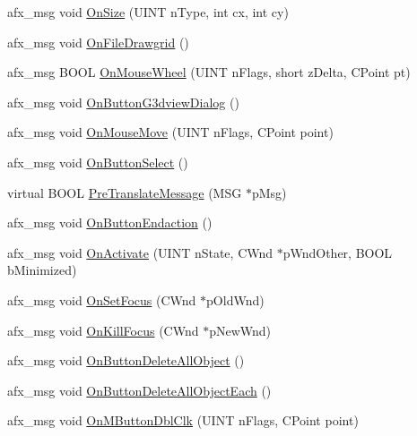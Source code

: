 \begin{DoxyCompactItemize}
afx\+\_\+msg void \hyperlink{class_c_g_engine_launcher_view_a1406ce0fb06054f8218ced4ef7499c20}{On\+Size} (U\+I\+N\+T n\+Type, int cx, int cy)
\item 
afx\+\_\+msg void \hyperlink{class_c_g_engine_launcher_view_a2544a1f783fbf199d48b3254229dcdb6}{On\+File\+Drawgrid} ()
\item 
afx\+\_\+msg B\+O\+O\+L \hyperlink{class_c_g_engine_launcher_view_a3d17ad11f2403edab90ffb90dfe16ce5}{On\+Mouse\+Wheel} (U\+I\+N\+T n\+Flags, short z\+Delta, C\+Point pt)
\item 
afx\+\_\+msg void \hyperlink{class_c_g_engine_launcher_view_a4f4492bcaa6d840ccf669be0c9f2cf86}{On\+Button\+G3dview\+Dialog} ()
\item 
afx\+\_\+msg void \hyperlink{class_c_g_engine_launcher_view_a3550309fd36ab74a7cbb04f5ad85f3e9}{On\+Mouse\+Move} (U\+I\+N\+T n\+Flags, C\+Point point)
\item 
afx\+\_\+msg void \hyperlink{class_c_g_engine_launcher_view_a751a6bb09a6f0c626b6f0e27d1fd6fdb}{On\+Button\+Select} ()
\item 
virtual B\+O\+O\+L \hyperlink{class_c_g_engine_launcher_view_a75b3445bc9921ee1fd8c5cdeac009c12}{Pre\+Translate\+Message} (M\+S\+G $\ast$p\+Msg)
\item 
afx\+\_\+msg void \hyperlink{class_c_g_engine_launcher_view_a581e1d2ea2da828702661a11ecbe70bd}{On\+Button\+Endaction} ()
\item 
afx\+\_\+msg void \hyperlink{class_c_g_engine_launcher_view_adb2f9dc7d7b3bcfc03daddead2d95494}{On\+Activate} (U\+I\+N\+T n\+State, C\+Wnd $\ast$p\+Wnd\+Other, B\+O\+O\+L b\+Minimized)
\item 
afx\+\_\+msg void \hyperlink{class_c_g_engine_launcher_view_a01a9005d413022777176ff7fe6cc8a10}{On\+Set\+Focus} (C\+Wnd $\ast$p\+Old\+Wnd)
\item 
afx\+\_\+msg void \hyperlink{class_c_g_engine_launcher_view_a5554684feb6a46b6a37c47a956419e9c}{On\+Kill\+Focus} (C\+Wnd $\ast$p\+New\+Wnd)
\item 
afx\+\_\+msg void \hyperlink{class_c_g_engine_launcher_view_ac9dc72960ae95b74229bbd836f25de37}{On\+Button\+Delete\+All\+Object} ()
\item 
afx\+\_\+msg void \hyperlink{class_c_g_engine_launcher_view_adea700678f748fda7efd6f433767cae6}{On\+Button\+Delete\+All\+Object\+Each} ()
\item 
afx\+\_\+msg void \hyperlink{class_c_g_engine_launcher_view_abd6c1ccaaf1aac42329f721643ff84a1}{On\+M\+Button\+Dbl\+Clk} (U\+I\+N\+T n\+Flags, C\+Point point)
\item 

\end{DoxyCompactItemize}
